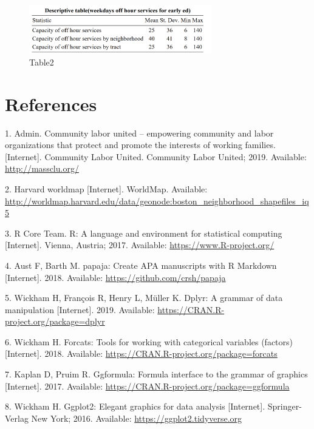 \documentclass[10pt,letterpaper]{article}
\begin{document}
\begin{figure}
\centering
\includegraphics[width=3.12500in]{table2.png}
\caption{Table2}
\end{figure}

\section*{References}\label{references.unumbered}

\hypertarget{refs}{}
\hypertarget{ref-admin_2019}{}
1. Admin. Community labor united -- empowering community and labor
organizations that protect and promote the interests of working
families. {[}Internet{]}. Community Labor United. Community Labor
United; 2019. Available: \url{http://massclu.org/}

\hypertarget{ref-worldmap}{}
2. Harvard worldmap {[}Internet{]}. WorldMap. Available:
\url{http://worldmap.harvard.edu/data/geonode:boston_neighborhood_shapefiles_iq5}

\hypertarget{ref-R-base}{}
3. R Core Team. R: A language and environment for statistical computing
{[}Internet{]}. Vienna, Austria; 2017. Available:
\url{https://www.R-project.org/}

\hypertarget{ref-R-papaja}{}
4. Aust F, Barth M. papaja: Create APA manuscripts with R Markdown
{[}Internet{]}. 2018. Available: \url{https://github.com/crsh/papaja}

\hypertarget{ref-R-dplyr}{}
5. Wickham H, François R, Henry L, Müller K. Dplyr: A grammar of data
manipulation {[}Internet{]}. 2019. Available:
\url{https://CRAN.R-project.org/package=dplyr}

\hypertarget{ref-R-forcats}{}
6. Wickham H. Forcats: Tools for working with categorical variables
(factors) {[}Internet{]}. 2018. Available:
\url{https://CRAN.R-project.org/package=forcats}

\hypertarget{ref-R-ggformula}{}
7. Kaplan D, Pruim R. Ggformula: Formula interface to the grammar of
graphics {[}Internet{]}. 2017. Available:
\url{https://CRAN.R-project.org/package=ggformula}

\hypertarget{ref-R-ggplot2}{}
8. Wickham H. Ggplot2: Elegant graphics for data analysis
{[}Internet{]}. Springer-Verlag New York; 2016. Available:
\url{https://ggplot2.tidyverse.org}
\end{document}
